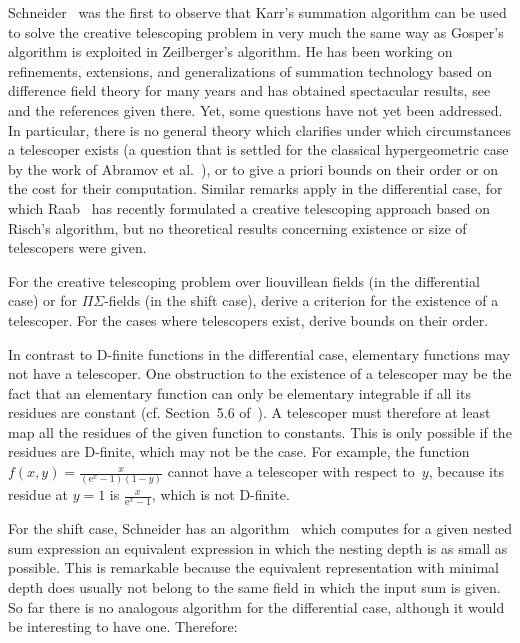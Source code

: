 \documentclass{jssc}
\def\e{\mathrm{e}}
\begin{document}
 Schneider~\cite{schneider01} was the first to observe that Karr's summation algorithm
 can be used to solve the creative telescoping problem in very much the same way
 as Gosper's algorithm is exploited in Zeilberger's algorithm. He has been working
 on refinements, extensions, and generalizations of summation technology based on
 difference field theory for many years and has obtained spectacular results, see
 \cite{schneider13b} and the references given there. Yet, some questions have not yet
 been addressed. In particular, there is no general theory which clarifies
 under which circumstances a telescoper exists (a question that is settled for the
 classical hypergeometric case by the work of Abramov et al.~\cite{abramov02a,abramov02,abramov03,abramov05a}), or to
 give a priori bounds on their order or on the cost for their computation. Similar
 remarks apply in the differential case, for which Raab~\cite{raab12} has recently
 formulated a creative telescoping approach based on Risch's algorithm, but no
 theoretical results concerning existence or size of telescopers were given.

 \begin{problem}
   For the creative telescoping problem over liouvillean fields (in the differential case)
   or for $\Pi\Sigma$-fields (in the shift case), derive a criterion for the existence
   of a telescoper. For the cases where telescopers exist, derive bounds on their order.
 \end{problem}

 In contrast to D-finite functions in the differential case, elementary
 functions may not have a telescoper. One obstruction to the existence of a telescoper
 may be the fact that an elementary function can only be elementary integrable if
 all its residues are constant (cf. Section~5.6 of~\cite{bronstein97}). A telescoper
 must therefore at least map all the residues of the given function to constants. This
 is only possible if the residues are D-finite, which may not be the case. For example,
 the function $f(x,y)=\frac{x}{(\e^x-1)(1-y)}$ cannot have a telescoper with respect to~$y$,
 because its residue at $y=1$ is $\frac{x}{\e^x-1}$, which is not D-finite.

 For the shift case, Schneider has an algorithm~\cite{schneider05a} which computes for a given
 nested sum expression an equivalent expression in which the nesting depth is as small
 as possible. This is remarkable because the equivalent representation with minimal
 depth does usually not belong to the same field in which the input sum is given. So far
 there is no analogous algorithm for the differential case, although it would be
 interesting to have one. Therefore:
\end{document}
